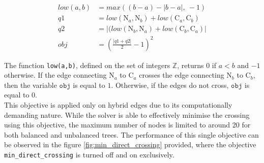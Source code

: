 \documentclass{article}
\begin{document}
\begin{align}
    low(a, b) &= max((b - a) - |b-a|  ,~ -1)\\
    q1 &= low(\text{N}_a, \text{N}_b) + low(\text{C}_a, \text{C}_b)\\
    q2 & = | (low(\text{N}_b, \text{N}_a) + low(\text{C}_b, \text{C}_a) |\\
    obj &= \left(\frac{|q1 + q2|}{2} - 1\right)^2
\end{align}

The function \texttt{low(a,b)}, defined on the set of integers $\mathbb{Z}$, returns $0$ if $a < b$ and $-1$ otherwise. If the edge connecting $\text{N}_a$ to $\text{C}_a$ crosses the edge connecting $\text{N}_b$ to $\text{C}_b$, then the variable $\texttt{obj}$ is equal to $1$. Otherwise, if the edges do not cross, $\texttt{obj}$ is equal to $0$.\\

This objective is applied only on hybrid edges due to its computationally demanding nature. While the solver is able to effectively minimise the crossing using this objective, the maximum number of nodes is limited to around 20 for both balanced and unbalanced trees. The performance of this single objective can be observed in the figure \ref{fig:min_direct_crossing} provided, where the objective \texttt{min\_direct\_crossing} is turned off and on exclusively.
\end{document}
